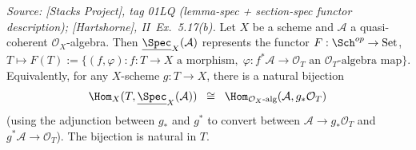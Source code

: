 \begin{theorem}
  \textit{Source: [Stacks Project], tag 01LQ (lemma-spec + section-spec
  functor description); [Hartshorne], II~Ex.~5.17(b).}
  Let \(X\) be a scheme and \(\mathcal{A}\) a quasi-coherent \(\mathcal{O}_X\)-algebra.
  Then \(\underline{\Spec}_X(\mathcal{A})\) represents the functor
  \(F : \Sch^{op} \to \mathrm{Set}\),
  $T \mapsto F(T) := \{(f, \varphi) : f : T \to X \text{ a morphism},\;
  \varphi : f^* \mathcal{A} \to \mathcal{O}_T \text{ an } \mathcal{O}_T\text{-algebra map}\}.$
  Equivalently, for any \(X\)-scheme \(g : T \to X\),
  there is a natural bijection
  \[
    \Hom_X(T, \underline{\Spec}_X(\mathcal{A})) \;\;\cong\;\;
    \Hom_{\mathcal{O}_X\text{-alg}}(\mathcal{A}, g_* \mathcal{O}_T)
  \]
  (using the adjunction between \(g_*\) and \(g^*\) to convert between
  \(\mathcal{A} \to g_*\mathcal{O}_T\) and \(g^*\mathcal{A} \to \mathcal{O}_T\)).
  The bijection is natural in \(T\).
\end{theorem}

